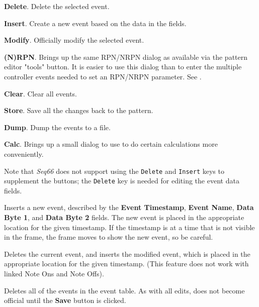    \begin{enumber}
      \item \textbf{Delete}.
         Delete the selected event.
      \item \textbf{Insert}.
         Create a new event based on the data in the fields.
      \item \textbf{Modify}.
         Officially modify the selected event.
      \item \textbf{(N)RPN}.
         Brings up the same RPN/NRPN dialog as available via
         the pattern editor "tools" button.
         It is easier to use this dialog than to enter the multiple
         controller events needed to set an RPN/NRPN parameter.
         See .
      \item \textbf{Clear}.
         Clear all events.
      \item \textbf{Store}.
         Save all the changes back to the pattern.
      \item \textbf{Dump}.
         Dump the events to a file.
      \item \textbf{Calc}.
         Brings up a small dialog to use to do certain calculations
         more conveniently.
   \end{enumber}

   Note that
   \textsl{Seq66} does not support using the
   \texttt{Delete} and \texttt{Insert} keys to
   supplement the buttons; the \texttt{Delete}
   key is needed for editing the event data fields.

   \setcounter{ItemCounter}{0}      %

   Inserts a new event, described by the 
   \textbf{Event Timestamp},
   \textbf{Event Name},
   \textbf{Data Byte 1}, and
   \textbf{Data Byte 2} fields.
   The new event is placed in the appropriate location for the given timestamp.
   If the timestamp is at a time that is not visible in the frame, the frame
   moves to show the new event, so be careful.

   Deletes the current event, and inserts the modified event,
   which is placed in the appropriate location for the given
   timestamp.  (This feature does not work with linked Note Ons and Note Offs).

   Deletes all of the events in the event table.
   As with all edits, does not become official until the \textbf{Save} button
   is clicked.

